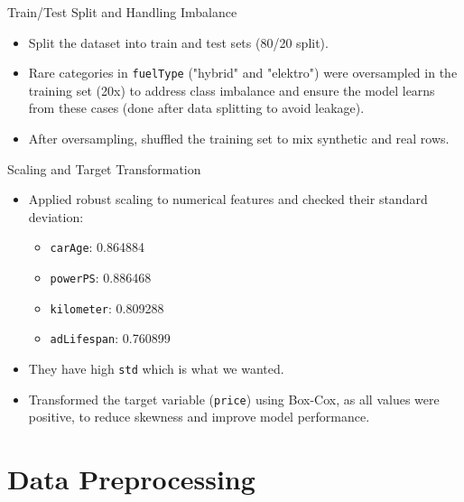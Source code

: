 \documentclass{beamer}
\begin{document}
\begin{frame}{Train/Test Split and Handling Imbalance}
        \begin{itemize}
                \item Split the dataset into train and test sets (80/20 split).
                \item Rare categories in \texttt{fuelType} ("hybrid" and
                        "elektro") were oversampled in the training set (20x)
                        to address class imbalance and ensure the model learns
                        from these cases (done after data splitting to avoid
                        leakage).
                \item After oversampling, shuffled the training set to mix
                        synthetic and real rows.
        \end{itemize}
\end{frame}

\begin{frame}{Scaling and Target Transformation}
        \begin{itemize}
                \item Applied robust scaling to numerical features and checked
                        their standard deviation:
                        \begin{itemize}
                                \item \texttt{carAge}: 0.864884
                                \item \texttt{powerPS}: 0.886468
                                \item \texttt{kilometer}: 0.809288
                                \item \texttt{adLifespan}: 0.760899
                        \end{itemize}
                \item They have high \texttt{std} which is what we wanted.
                \item Transformed the target variable (\texttt{price}) using
                        Box-Cox, as all values were positive, to reduce
                        skewness and improve model performance.
        \end{itemize}
\end{frame}

\section{Data Preprocessing}
\end{document}
